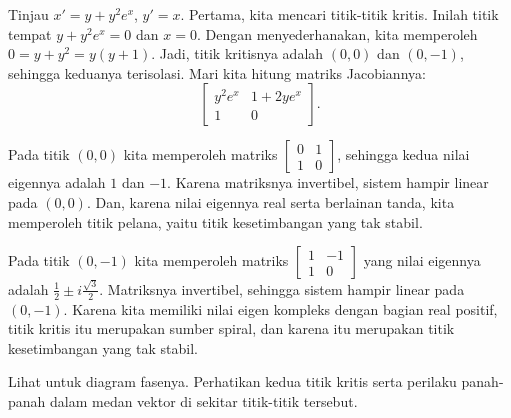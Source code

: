 \begin{example} \label{example:nlin-withexp}
Tinjau
$x'=y+y^2e^x$,
$y'=x$. Pertama, kita mencari titik-titik kritis. Inilah titik tempat
$y+y^2e^x = 0$ dan $x=0$. Dengan menyederhanakan, kita memperoleh $0=y+y^2 = y(y+1)$. Jadi,
titik kritisnya adalah $(0,0)$ dan $(0,-1)$, sehingga keduanya terisolasi. Mari kita
hitung matriks Jacobiannya:
\begin{equation*}
\begin{bmatrix}
y^2e^x & 1+2ye^x \\
1 & 0
\end{bmatrix}.
\end{equation*}

Pada titik $(0,0)$ kita memperoleh matriks
$\left[ \begin{smallmatrix} 0 & 1 \\ 1 & 0 \end{smallmatrix} \right]$, sehingga
kedua nilai eigennya adalah $1$ dan $-1$. Karena matriksnya invertibel, sistem hampir linear
pada $(0,0)$. Dan, karena nilai eigennya real
serta berlainan tanda, kita memperoleh titik pelana, yaitu titik kesetimbangan
yang tak stabil.

Pada titik $(0,-1)$ kita memperoleh matriks
$\left[ \begin{smallmatrix} 1 & -1 \\ 1 & 0 \end{smallmatrix} \right]$ yang
nilai eigennya adalah $\frac{1}{2} \pm i \frac{\sqrt{3}}{2}$.
Matriksnya invertibel, sehingga sistem hampir linear pada $(0,-1)$.
Karena kita memiliki nilai eigen kompleks dengan bagian real positif, titik
kritis itu merupakan sumber spiral, dan karena itu merupakan titik kesetimbangan yang tak stabil.

\begin{myfig}
\capstart
{}
\caption{Potret fase beserta beberapa contoh lintasan dari
$x'=y+y^2e^x$, $y'=x$. \label{fig:nlin-ex813}}
\end{myfig}

Lihat  untuk diagram fasenya. Perhatikan kedua
titik kritis serta perilaku panah-panah dalam medan vektor di sekitar
titik-titik tersebut.
\end{example}

